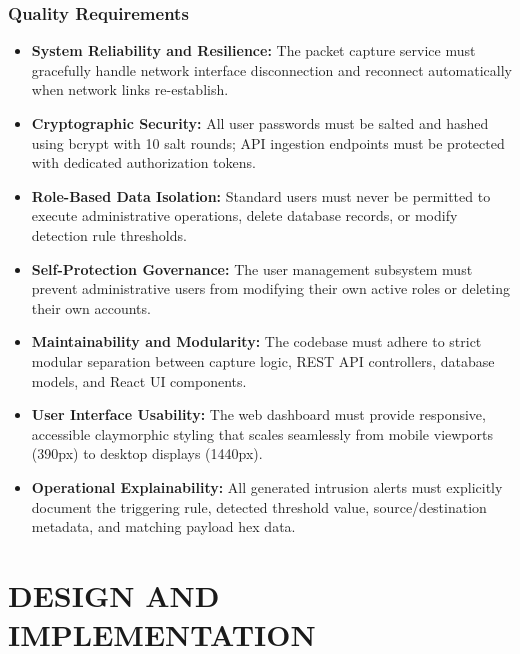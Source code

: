 \documentclass[a4paper,12pt]{report}
\begin{document}
	\subsection{Quality Requirements}
	\begin{itemize}
		\item \textbf{System Reliability and Resilience:} The packet capture service must gracefully handle network interface disconnection and reconnect automatically when network links re-establish.
		\item \textbf{Cryptographic Security:} All user passwords must be salted and hashed using bcrypt with 10 salt rounds; API ingestion endpoints must be protected with dedicated authorization tokens.
		\item \textbf{Role-Based Data Isolation:} Standard users must never be permitted to execute administrative operations, delete database records, or modify detection rule thresholds.
		\item \textbf{Self-Protection Governance:} The user management subsystem must prevent administrative users from modifying their own active roles or deleting their own accounts.
		\item \textbf{Maintainability and Modularity:} The codebase must adhere to strict modular separation between capture logic, REST API controllers, database models, and React UI components.
		\item \textbf{User Interface Usability:} The web dashboard must provide responsive, accessible claymorphic styling that scales seamlessly from mobile viewports (390px) to desktop displays (1440px).
		\item \textbf{Operational Explainability:} All generated intrusion alerts must explicitly document the triggering rule, detected threshold value, source/destination metadata, and matching payload hex data.
	\end{itemize}
	
	\chapter{DESIGN AND IMPLEMENTATION}
	
\end{document}
